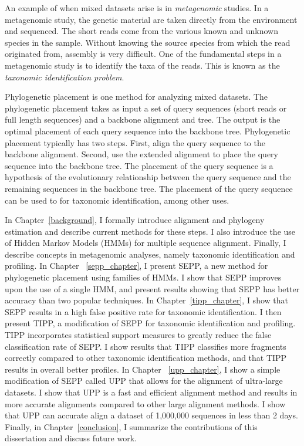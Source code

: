 An example of when mixed datasets arise is in \emph{metagenomic} studies.  In a metagenomic study, the genetic material are taken directly from the environment and sequenced.  The short reads come from the various known and unknown species in the sample.  Without knowing the source species from which the read originated from, assembly is very difficult.  One of the fundamental steps in a metagenomic study is to identify the taxa of the reads.  This is known as the \emph{taxonomic identification problem}.  %

Phylogenetic placement is one method for analyzing mixed datasets.  The phylogenetic placement takes as input a set of query sequences (short reads or full length sequences) and a backbone alignment and tree.  The output is the optimal placement of each query sequence into the backbone tree.  Phylogenetic placement typically has two steps.  First, align the query sequence to the backbone alignment.  Second, use the extended alignment to place the query sequence into the backbone tree.  The placement of the query sequence is a hypothesis of the evolutionary relationship between the query sequence and the remaining sequences in the backbone tree.  The placement of the query sequence can be used to for taxonomic identification, among other uses.

In Chapter~\ref{background}, I formally introduce alignment and phylogeny estimation and describe current methods for these steps.  I also introduce the use of Hidden Markov Models (HMMs) for multiple sequence alignment.  Finally, I describe concepts in metagenomic analyses, namely taxonomic identification and profiling.  In Chapter ~\ref{sepp_chapter}, I present SEPP, a new method for phylogenetic placement using families of HMMs.  I show that SEPP improves upon the use of a single HMM, and present results showing that SEPP has better accuracy than two popular techniques.  In Chapter~\ref{tipp_chapter}, I show that SEPP results in a high false positive rate for taxonomic identification.  I then present TIPP, a modification of SEPP for taxonomic identification and profiling.  TIPP incorporates statistical support measures to greatly reduce the false classification rate of SEPP.  I show results that TIPP classifies more fragments correctly compared to other taxonomic identification methods, and that TIPP results in overall better profiles.  In Chapter ~\ref{upp_chapter}, I show a simple modification of SEPP called UPP that allows for the alignment of ultra-large datasets.  I show that UPP is a fast and efficient alignment method and results in more accurate alignments compared to other large alignment methods.  I show that UPP can accurate align a dataset of 1,000,000 sequences in less than 2 days.  Finally, in Chapter~\ref{conclusion}, I summarize the contributions of this dissertation and discuss future work.